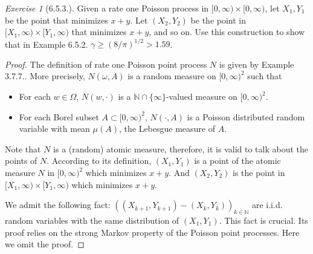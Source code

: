 \documentclass[12pt,a4paper]{amsart}
\theoremstyle{plain}
\theoremstyle{definition}
\theoremstyle{remark}
\newtheorem*{exe}{Exercise}
\numberwithin{equation}{section}
\begin{document}
\begin{exe}[6.5.3.]
Given a rate one Poisson process in $[0,\infty)\times [0,\infty)$, let $X_1,Y_1$ be the point that minimizes $x+y$.
Let $(X_2,Y_2)$ be the point in $[X_1,\infty) \times [Y_1,\infty)$ that minimizes $x+y$, and so on.
Use this construction to show that in Example 6.5.2. $\gamma \geq (8/\pi)^{1/2} > 1.59$. 
\end{exe} 
\begin{proof}
The definition of rate one Poisson point process $N$ is given by Example 3.7.7.. 
More precisely, $N(\omega,A)$ is a random measure on $[0,\infty)^2$ such that
\begin{itemize}
\item
For each $w\in \Omega$, $N(w,\cdot)$ is a $\mathbb N\cap \{\infty\}$-valued measure on $[0,\infty)^2$.
\item
For each Borel subset $A\subset [0,\infty)^2$, $N(\cdot, A)$ is a Poisson distributed random variable with mean $\mu(A)$, the Lebesgue measure of $A$.
\end{itemize}
Note that $N$ is a (random) atomic measure, therefore, it is valid to talk about the points of $N$.
According to its definition, $(X_1,Y_1)$ is a point of the atomic measure $N$ in $[0,\infty)^2$ which minimizes $x+y$. 
And $(X_2,Y_2)$ is the point in $[X_1,\infty) \times [Y_1,\infty)$ which minimizes $x+y$. 

We admit the following fact:
$\left(  (X_{k+1}, Y_{k+1}) - (X_k, Y_k)\right)_{k \in \mathbb N}$ are i.i.d. random variables with the same distribution of $(X_1,Y_1)$.
This fact is crucial. Its proof relies on the strong Markov property of the Poisson point processes. Here we omit the proof.


\end{proof}
\end{document}
